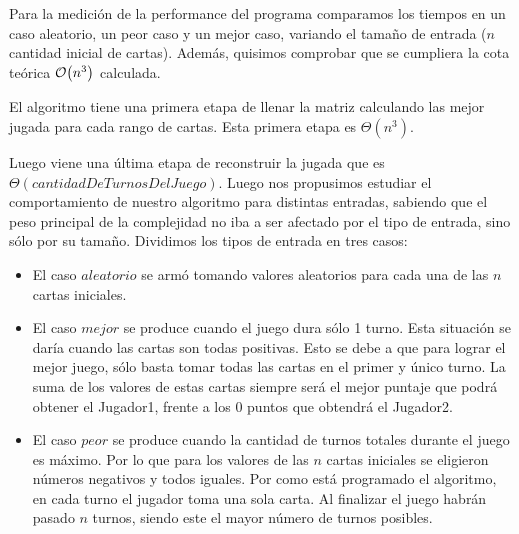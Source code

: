\documentclass[11pt, a4paper, twoside]{article}
\begin{document}
{}

Para la medición de la performance del programa comparamos los tiempos en un caso aleatorio, un peor caso y 
un mejor caso, variando el tamaño de entrada ($n$ cantidad inicial de cartas). Además, quisimos comprobar que se 
cumpliera la cota teórica $\mathop{}\mathopen{}\mathcal{O}\mathopen{}\left(n^3\right)$ calculada. 

El algoritmo tiene una primera etapa de llenar la matriz calculando las mejor jugada para cada rango de cartas. Esta primera etapa es $\Theta(n^3)$.

Luego viene una última etapa de reconstruir la jugada que es $\Theta(cantidadDeTurnosDelJuego)$. Luego nos propusimos estudiar el comportamiento de nuestro algoritmo para distintas entradas, sabiendo que el peso principal de la complejidad no iba a ser afectado por el tipo de entrada, sino sólo por su tamaño. Dividimos los tipos de entrada en tres casos: 
 
\begin{itemize}
\item El caso $aleatorio$ se armó tomando valores aleatorios para cada una de las $n$ cartas iniciales. 
\item El caso $mejor$ se produce cuando el juego dura sólo 1 turno. Esta situación se daría cuando las cartas son 
todas positivas. Esto se debe a que para lograr el mejor juego, sólo basta tomar todas las cartas en el primer y 
único turno. La suma de los valores de estas cartas siempre será el mejor puntaje que podrá obtener 
el Jugador1, frente a los 0 puntos que obtendrá el Jugador2. 
\item El caso $peor$ se produce cuando la cantidad de turnos totales durante el juego es máximo. 
Por lo que para los valores de las $n$ cartas iniciales se eligieron números negativos y todos iguales. 
Por como está programado el algoritmo, en cada turno el jugador toma una sola carta. Al finalizar el juego habrán pasado $n$ turnos, 
siendo este el mayor número de turnos posibles.
\end{itemize}
\end{document}
